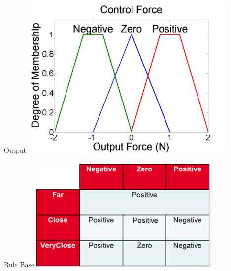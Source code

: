 \documentclass[]{beamer}
\begin{document}
\begin{frame}{Output}
    \centering
    \vspace{2em}
    \includegraphics[width=0.8\textwidth]{media/image19}
\end{frame}

\begin{frame}{Rule Base}
    \centering
    \vspace{2em}
    \includegraphics[width=0.7\textwidth]{media/image20}
\end{frame}
\end{document}
